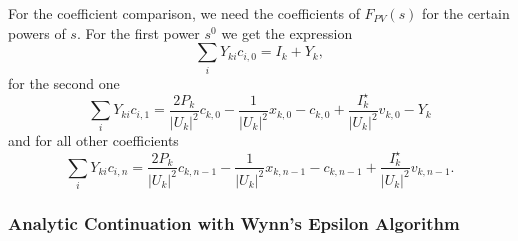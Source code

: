 For the coefficient comparison, we need the coefficients of $F_{PV}(s)$ for the certain powers of $s$. For the first power $s^0$ we get the expression
\begin{equation}
	\sum_i Y_{ki} c_{i,0} = I_k + Y_k,
\end{equation}
for the second one
\begin{equation}
	\sum_i Y_{ki} c_{i,1} = \frac{2 P_k}{|U_k|^2} c_{k,0} - \frac{1}{|U_k|^2} x_{k,0} - c_{k,0} + \frac{I_k^\star}{|U_k|^2} v_{k,0} - Y_k
\end{equation}
and for all other coefficients
\begin{equation}
	\sum_i Y_{ki} c_{i,n} = \frac{2 P_k}{|U_k|^2} c_{k,n-1} - \frac{1}{|U_k|^2} x_{k,n-1} - c_{k,n-1} + \frac{I_k^\star}{|U_k|^2} v_{k,n-1}.
\end{equation}

\subsubsection{Analytic Continuation with Wynn's Epsilon Algorithm}

